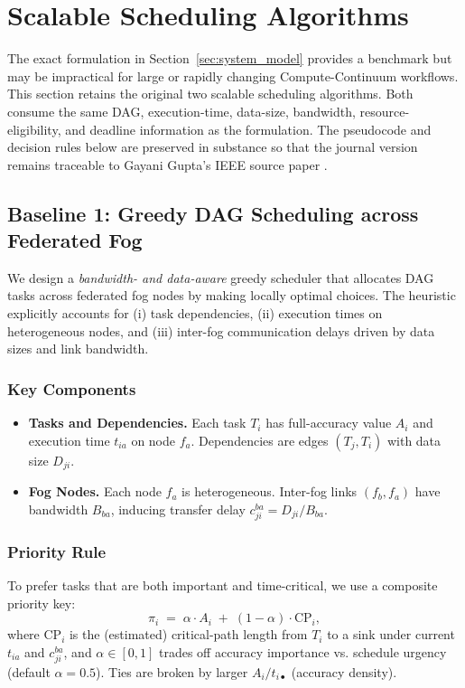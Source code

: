 \section{Scalable Scheduling Algorithms}
\label{sec:algorithms}

The exact formulation in Section~\ref{sec:system_model} provides a benchmark but may be impractical for large or rapidly changing Compute-Continuum workflows. This section retains the original two scalable scheduling algorithms. Both consume the same DAG, execution-time, data-size, bandwidth, resource-eligibility, and deadline information as the formulation. The pseudocode and decision rules below are preserved in substance so that the journal version remains traceable to Gayani Gupta's IEEE source paper \cite{gupta2025efficient}.

\subsection{Baseline 1: Greedy DAG Scheduling across Federated Fog}
\label{sec:baseline-greedy}

We design a \emph{bandwidth- and data-aware} greedy scheduler that allocates DAG tasks across federated fog nodes by making locally optimal choices. The heuristic explicitly accounts for (i) task dependencies, (ii) execution times on heterogeneous nodes, and (iii) inter-fog communication delays driven by data sizes and link bandwidth.

\subsubsection{Key Components}
\begin{itemize}
    \item \textbf{Tasks and Dependencies.} Each task \(T_i\) has full-accuracy value \(A_i\) and execution time \(t_{ia}\) on node \(f_a\). Dependencies are edges \((T_j,T_i)\) with data size \(D_{ji}\).
    \item \textbf{Fog Nodes.} Each node \(f_a\) is heterogeneous. Inter-fog links \((f_b,f_a)\) have bandwidth \(B_{ba}\), inducing transfer delay \(c_{ji}^{ba}=D_{ji}/B_{ba}\).
\end{itemize}

\subsubsection{Priority Rule}
To prefer tasks that are both important and time-critical, we use a composite priority key:
\[
\pi_i \;=\; \alpha \cdot A_i \;+\; (1-\alpha)\cdot \text{CP}_i,
\]
where \(\text{CP}_i\) is the (estimated) critical-path length from \(T_i\) to a sink under current \(t_{ia}\) and \(c_{ji}^{ba}\), and \(\alpha\in[0,1]\) trades off accuracy importance vs. schedule urgency (default \(\alpha=0.5\)). Ties are broken by larger \(A_i/t_{i\bullet}\) (accuracy density).

